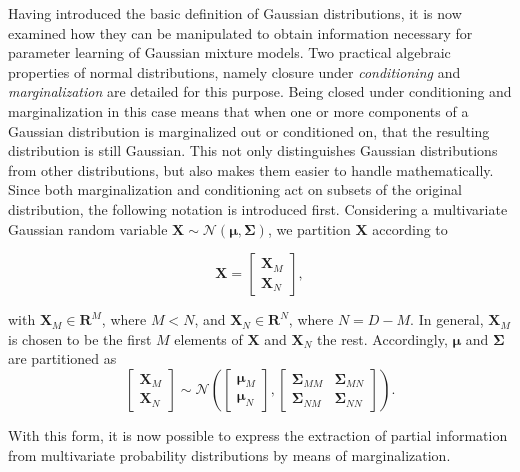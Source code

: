 \documentclass[../../../main.tex]{subfiles}
\begin{document}
Having introduced the basic definition of Gaussian distributions, it is now examined how they can be manipulated to obtain information necessary for parameter learning of Gaussian mixture models. Two practical algebraic properties of normal distributions, namely closure under \textit{conditioning} and \textit{marginalization} are detailed for this purpose. Being closed under conditioning and marginalization in this case means that when one or more components of a Gaussian distribution is marginalized out or conditioned on, that the resulting distribution is still Gaussian. This not only distinguishes Gaussian distributions from other distributions, but also makes them easier to handle mathematically. Since both marginalization and conditioning act on subsets of the original distribution, the following notation is introduced first. Considering a multivariate Gaussian random variable $\bm{X} \sim \mathcal{N}(\bm{\mu}, \bm{\Sigma})$, we partition $\bm{X}$ according to 

\begin{equation*}
    \bm{X} = \left[ \begin{array}{c}
        \bm{X}_M \\
        \bm{X}_N
    \end{array} \right],
\end{equation*}

with $\bm{X}_M \in \mathbf{R}^M$, where $M < N$, and $\bm{X}_N \in \mathbf{R}^N$, where $N=D-M$. In general, $\bm{X}_M$ is chosen to be the first $M$ elements of $\bm{X}$ and $\bm{X}_N$ the rest. Accordingly, $\bm{\mu}$ and $\bm{\Sigma}$ are partitioned as
\begin{equation*}
    \left[ \begin{array}{c}
        \bm{X}_M \\
        \bm{X}_N
    \end{array} \right] \sim \mathcal{N} \left( \left[\begin{array}{c}
         \bm{\mu}_M \\
         \bm{\mu}_N
    \end{array}\right], \left[\begin{array}{cc}
        \bm{\Sigma}_{MM} & \bm{\Sigma}_{MN} \\
        \bm{\Sigma}_{NM} & \bm{\Sigma}_{NN}
    \end{array}\right] \right).
\end{equation*}

With this form, it is now possible to express the extraction of partial information from multivariate probability distributions by means of marginalization. 
\end{document}

